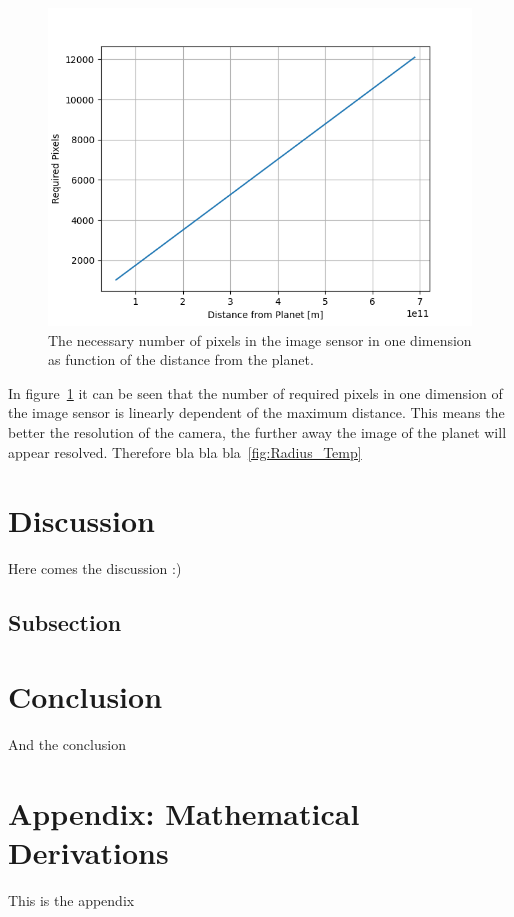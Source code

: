 \documentclass[reprint,english,notitlepage]{revtex4-2}
\begin{document}
	\begin{figure}[h]
		\centering
		\includegraphics[scale=0.4]{Figures/Res_pixels}
		\caption{The necessary number of pixels in the image sensor in one dimension as function of the distance from the planet.}\label{fig:Res_pixels}
	\end{figure}

	In figure~\ref{fig:Res_pixels} it can be seen that the number of required pixels in one dimension of the image sensor is linearly dependent of the maximum distance.
	This means the better the resolution of the camera, the further away the image of the planet will appear resolved.
	Therefore bla bla bla~\ref{fig:Radius_Temp}

\section{Discussion} \label{sec:discussion}
Here comes the discussion :)
	\subsection{Subsection}

\section{Conclusion} \label{sec:conclusion}
And the conclusion

\newpage

\section{Appendix: Mathematical Derivations}
This is the appendix


\newpage
\printbibliography
\end{document}
